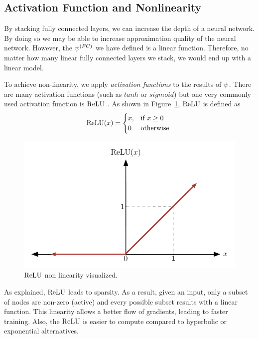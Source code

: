 \subsection{Activation Function and Nonlinearity}
By stacking fully connected layers, we can increase the depth of a neural network. By doing so we may be able to increase approximation quality of the neural network. However, the $\psi^{(FC)}$ we have defined is a linear function. Therefore, no matter how many linear fully connected layers we stack, we would end up with a linear model.

To achieve non-linearity, we apply \textit{activation functions} to the results of $\psi$. There are many activation functions (such as $tanh$ or $sigmoid$) but one very commonly used activation function is $\textrm{ReLU}$ \cite{nair2010rectified}. As shown in Figure~\ref{fig:relu}, $\textrm{ReLU}$ is defined as
\begin{equation}
\label{eq:relu_definition}
    \textrm{ReLU}(x) = 
\begin{cases}
    x, & \text{if }x \geq 0\\
    0 &  \text{otherwise }\\
\end{cases}
\end{equation}
\begin{figure}[!h]
  \begin{centering}
    \includegraphics[width=.7\textwidth]{images/relu.pdf}
    \caption{$\textrm{ReLU}$ non linearity visualized.}
    \label{fig:relu}
  \end{centering}
\end{figure}


As \cite{glorot2011deep} explained, $\textrm{ReLU}$ leads to sparsity. As a result, given an input, only a subset of nodes are non-zero (active) and every possible subset results with a linear function. This linearity allows a better flow of gradients, leading to faster training. Also, the $\textrm{ReLU}$ is easier to compute compared to hyperbolic or exponential alternatives.

